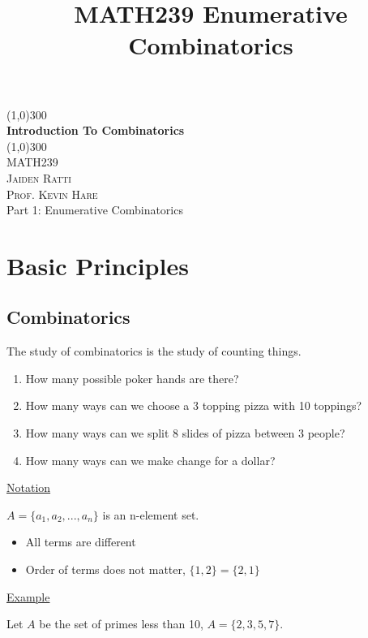 \documentclass{article}
\title{MATH239 Enumerative Combinatorics}
\begin{document}
\begin{titlepage}
	\begin{center}
    \line(1,0){300}\\
    [0.65cm]
	\huge{\bfseries Introduction To Combinatorics}\\
	\line(1,0){300}\\
	\textsc{\Large MATH239}\\
	\textsc{\Large  Jaiden Ratti}\\
        \textsc{\Large Prof. Kevin Hare}\\
        \Large Part 1: Enumerative Combinatorics\\
	[5.5cm]
	\end{center}
\end{titlepage}




\tableofcontents

\pagebreak

\section{Basic Principles}

\subsection{Combinatorics}

The study of combinatorics is the study of counting things. 

\begin{enumerate}
    \item How many possible poker hands are there?
    \item How many ways can we choose a 3 topping pizza with 10 toppings?
    \item How many ways can we split 8 slides of pizza between 3 people?
    \item How many ways can we make change for a dollar?
\end{enumerate}

\underline{Notation}

$A = \{a_1, a_2, ..., a_n\}$ is an n-element set. 
\begin{itemize}
    \item All terms are different
    \item Order of terms does not matter, $\{1,2\} = \{2,1\}$
\end{itemize}

\underline{Example}

Let $A$ be the set of primes less than 10, $A = \{2,3,5,7\}$. 
\end{document}
